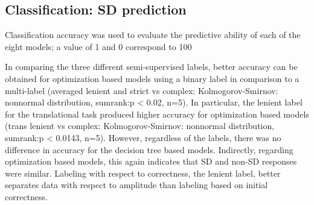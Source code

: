 \documentclass[11pt, onecolumn]{article}
\begin{document}
\subsection{Classification: SD prediction}
Classification accuracy was used to evaluate the predictive ability of each of the eight models; a value of 1 and 0 correspond to 100%

In comparing the three different semi-supervised labels, better accuracy can be obtained for optimization based models using a binary label in comparison to a multi-label (averaged lenient and strict vs complex:  Kolmogorov-Smirnov: nonnormal distribution, sumrank:p < 0.02, n=5).  In particular, the lenient label for the translational task produced higher accuracy for optimization based models (trans lenient vs complex: Kolmogorov-Smirnov: nonnormal distribution, sumrank:p < 0.0143, n=5).  However, regardless of the labels, there was no difference in accuracy for the decision tree based models. Indirectly, regarding optimization based models, this again indicates that SD and non-SD responses were similar.  Labeling with respect to correctness, the lenient label, better separates data with respect to amplitude than labeling based on initial correctness.
\end{document}
